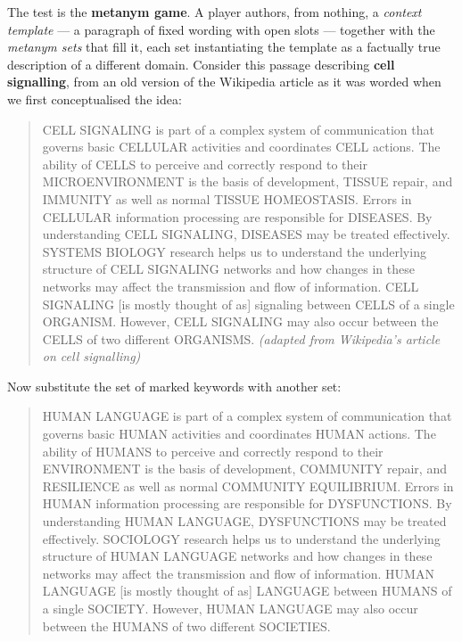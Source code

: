 The test is the \textbf{metanym game}. A player authors, from nothing, a \emph{context template} --- a paragraph of fixed wording with open slots --- together with the \emph{metanym sets} that fill it, each set instantiating the template as a factually true description of a different domain. Consider this passage describing \textbf{cell signalling}, from an old version of the Wikipedia article as it was worded when we first conceptualised the idea:

\begin{quote}
CELL SIGNALING is part of a complex system of communication that governs basic CELLULAR activities and coordinates CELL actions. The ability of CELLS to perceive and correctly respond to their MICROENVIRONMENT is the basis of development, TISSUE repair, and IMMUNITY as well as normal TISSUE HOMEOSTASIS. Errors in CELLULAR information processing are responsible for DISEASES. By understanding CELL SIGNALING, DISEASES may be treated effectively. SYSTEMS BIOLOGY research helps us to understand the underlying structure of CELL SIGNALING networks and how changes in these networks may affect the transmission and flow of information. CELL SIGNALING {[}is mostly thought of as{]} signaling between CELLS of a single ORGANISM. However, CELL SIGNALING may also occur between the CELLS of two different ORGANISMS. \emph{(adapted from Wikipedia's article on cell signalling)}
\end{quote}

Now substitute the set of marked keywords with another set:

\begin{quote}
HUMAN LANGUAGE is part of a complex system of communication that governs basic HUMAN activities and coordinates HUMAN actions. The ability of HUMANS to perceive and correctly respond to their ENVIRONMENT is the basis of development, COMMUNITY repair, and RESILIENCE as well as normal COMMUNITY EQUILIBRIUM. Errors in HUMAN information processing are responsible for DYSFUNCTIONS. By understanding HUMAN LANGUAGE, DYSFUNCTIONS may be treated effectively. SOCIOLOGY research helps us to understand the underlying structure of HUMAN LANGUAGE networks and how changes in these networks may affect the transmission and flow of information. HUMAN LANGUAGE {[}is mostly thought of as{]} LANGUAGE between HUMANS of a single SOCIETY. However, HUMAN LANGUAGE may also occur between the HUMANS of two different SOCIETIES.
\end{quote}

